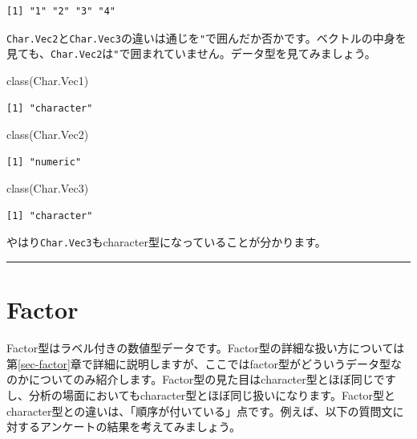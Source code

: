 \documentclass[
  a4paper,
  pandoc,
  ja=standard,
  jafont=haranoaji]{bxjsbook}
\newenvironment{Shaded}{\begin{snugshade}}{\end{snugshade}}
\newcommand{\FunctionTok}[1]{\textcolor[rgb]{0.28,0.35,0.67}{#1}}
\newcommand{\NormalTok}[1]{\textcolor[rgb]{0.00,0.48,0.65}{#1}}
\begin{document}
\begin{verbatim}
[1] "1" "2" "3" "4"
\end{verbatim}

\texttt{Char.Vec2}と\texttt{Char.Vec3}の違いは通じを\texttt{"}で囲んだか否かです。ベクトルの中身を見ても、\texttt{Char.Vec2}は\texttt{"}で囲まれていません。データ型を見てみましょう。

\begin{Shaded}
\begin{Highlighting}[numbers=left,,]
\FunctionTok{class}\NormalTok{(Char.Vec1)}
\end{Highlighting}
\end{Shaded}

\begin{verbatim}
[1] "character"
\end{verbatim}

\begin{Shaded}
\begin{Highlighting}[numbers=left,,]
\FunctionTok{class}\NormalTok{(Char.Vec2)}
\end{Highlighting}
\end{Shaded}

\begin{verbatim}
[1] "numeric"
\end{verbatim}

\begin{Shaded}
\begin{Highlighting}[numbers=left,,]
\FunctionTok{class}\NormalTok{(Char.Vec3)}
\end{Highlighting}
\end{Shaded}

\begin{verbatim}
[1] "character"
\end{verbatim}

やはり\texttt{Char.Vec3}もcharacter型になっていることが分かります。

\begin{center}\rule{0.5\linewidth}{0.5pt}\end{center}

\hypertarget{sec-type_factor}{%
\section{Factor}\label{sec-type_factor}}

Factor型はラベル付きの数値型データです。Factor型の詳細な扱い方については第\ref{sec-factor}章で詳細に説明しますが、ここではfactor型がどういうデータ型なのかについてのみ紹介します。Factor型の見た目はcharacter型とほぼ同じですし、分析の場面においてもcharacter型とほぼ同じ扱いになります。Factor型とcharacter型との違いは、「順序が付いている」点です。例えば、以下の質問文に対するアンケートの結果を考えてみましょう。
\end{document}
